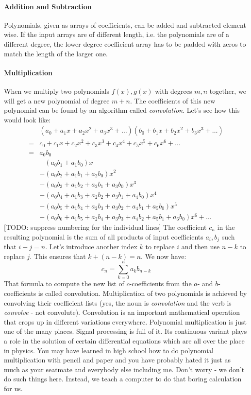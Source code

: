 \paragraph{Addition and Subtraction}
Polynomials, given as arrays of coefficients, can be added and subtracted element wise. If the input arrays are of different length, i.e. the polynomials are of a different degree, the lower degree coefficient array has to be padded with zeros to match the length of the larger one.

\paragraph{Multiplication}
When we multiply two polynomials $f(x), g(x)$ with degrees $m,n$ together, we will get a new polynomial of degree $m+n$. The coefficients of this new polynomial can be found by an algorithm called \emph{convolution}. Let's see how this would look like:
\begin{eqnarray}
&  (a_0 + a_1 x + a_2 x^2 + a_3 x^3 + \ldots)
   (b_0 + b_1 x + b_2 x^2 + b_3 x^3 + \ldots)  \\
=&  c_0 + c_1 x + c_2 x^2 + c_3 x^3 + c_4 x^4 + c_5 x^5 + c_6 x^6 + \ldots \\
=&  a_0 b_0 \\
&+ (a_0 b_1 + a_1 b_0) x \\
&+ (a_0 b_2 + a_1 b_1 + a_2 b_0) x^2 \\
&+ (a_0 b_3 + a_1 b_2 + a_2 b_1 + a_3 b_0) x^3  \\
&+ (a_0 b_4 + a_1 b_3 + a_2 b_2 + a_3 b_1 + a_4 b_0) x^4 \\
&+ (a_0 b_5 + a_1 b_4 + a_2 b_3 + a_3 b_2 + a_4 b_1 + a_5 b_0) x^5 \\
&+ (a_0 b_6 + a_1 b_5 + a_2 b_4 + a_3 b_3 + a_4 b_2 + a_5 b_1 + a_6 b_0) x^6 + \ldots
\end{eqnarray}
[TODO: suppress numbering for the individual lines] \newline
The coefficient $c_n$ in the resulting polynomial is the sum of all products of input coefficients $a_i, b_j$ such that $i+j = n$. Let's introduce another index $k$ to replace $i$ and then use $n-k$ to replace $j$. This ensures that $k + (n-k) = n$. We now have:
\begin{equation}
  c_n = \sum_{k=0}^n a_k b_{n-k}
\end{equation}
That formula to compute the new list of $c$-coefficients from the $a$- and $b$-coefficients is called convolution. Multiplication of two polynomials is achieved by convolving their coefficient lists (yes, the noun is \emph{convolution} and the verb is \emph{convolve} - not convolute). Convolution is an important mathematical operation that crops up in different variations everywhere. Polynomial multiplication is just one of the many places. Signal processing is full of it. Its continuous variant plays a role in the solution of certain differential equations which are all over the place in physics. You may have learned in high school how to do polynomial multiplication with pencil and paper and you have probably hated it just as much as your seatmate and everybody else including me. Don't worry - we don't do such things here. Instead, we teach a computer to do that boring calculation for us.

